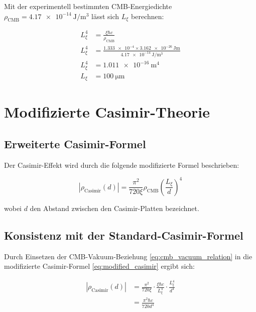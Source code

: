 	Mit der experimentell bestimmten CMB-Energiedichte \( \rho_{\text{CMB}} = \SI{4.17e-14}{\joule\per\meter^3} \) lässt sich \( L_\xi \) berechnen:
	
	\begin{align}
		L_\xi^4 &= \frac{\xi \hbar c}{\rho_{\text{CMB}}} \label{eq:Lxi_calculation}\\
		L_\xi^4 &= \frac{\num{1.333e-4} \times \SI{3.162e-26}{\joule\meter}}{\SI{4.17e-14}{\joule\per\meter^3}}\\
		L_\xi^4 &= \SI{1.011e-16}{\meter^4}\\
		L_\xi &= \SI{100}{\micro\meter} \label{eq:Lxi_result}
	\end{align}
	
	\section{Modifizierte Casimir-Theorie}
	
	\subsection{Erweiterte Casimir-Formel}
	
	Der Casimir-Effekt wird durch die folgende modifizierte Formel beschrieben:
	
	\begin{equation}
		|\rho_{\text{Casimir}}(d)| = \frac{\pi^2}{720\xi} \rho_{\text{CMB}} \left( \frac{L_\xi}{d} \right)^4 \label{eq:modified_casimir}
	\end{equation}
	
	
	
	wobei \( d \) den Abstand zwischen den Casimir-Platten bezeichnet.
	
	\subsection{Konsistenz mit der Standard-Casimir-Formel}
	
	Durch Einsetzen der CMB-Vakuum-Beziehung \eqref{eq:cmb_vacuum_relation} in die modifizierte Casimir-Formel \eqref{eq:modified_casimir} ergibt sich:
	
	\begin{align}
		|\rho_{\text{Casimir}}(d)| &= \frac{\pi^2}{720\xi} \cdot \frac{\xi \hbar c}{L_\xi^4} \cdot \frac{L_\xi^4}{d^4} \label{eq:casimir_substitution}\\
		&= \frac{\pi^2 \hbar c}{720 d^4} \label{eq:standard_casimir_recovered}
	\end{align}
	
